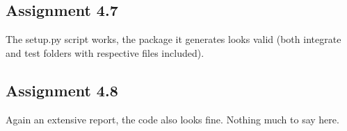 \documentclass[a4paper]{article}
\begin{document}
\subsection*{Assignment 4.7}
The setup.py script works, the package it generates looks valid (both integrate and test folders with respective files included).

\subsection*{Assignment 4.8}
Again an extensive report, the code also looks fine. Nothing much to say here.





\end{document}
